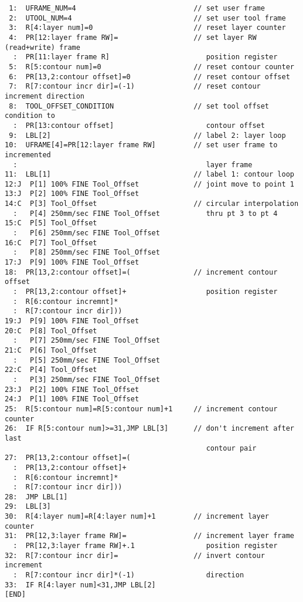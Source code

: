 \begin{verbatim}
 1:  UFRAME_NUM=4                            // set user frame
 2:  UTOOL_NUM=4                             // set user tool frame
 3:  R[4:layer num]=0                        // reset layer counter
 4:  PR[12:layer frame RW]=                  // set layer RW (read+write) frame 
  :  PR[11:layer frame R]                       position register   
 5:  R[5:contour num]=0                      // reset contour counter
 6:  PR[13,2:contour offset]=0               // reset contour offset
 7:  R[7:contour incr dir]=(-1)              // reset contour increment direction
 8:  TOOL_OFFSET_CONDITION                   // set tool offset condition to  
  :  PR[13:contour offset]                      contour offset
 9:  LBL[2]                                  // label 2: layer loop
10:  UFRAME[4]=PR[12:layer frame RW]         // set user frame to incremented 
  :                                             layer frame
11:  LBL[1]                                  // label 1: contour loop
12:J  P[1] 100% FINE Tool_Offset             // joint move to point 1
13:J  P[2] 100% FINE Tool_Offset
14:C  P[3] Tool_Offset                       // circular interpolation 
  :   P[4] 250mm/sec FINE Tool_Offset           thru pt 3 to pt 4
15:C  P[5] Tool_Offset
  :   P[6] 250mm/sec FINE Tool_Offset
16:C  P[7] Tool_Offset
  :   P[8] 250mm/sec FINE Tool_Offset
17:J  P[9] 100% FINE Tool_Offset
18:  PR[13,2:contour offset]=(               // increment contour offset 
  :  PR[13,2:contour offset]+                   position register
  :  R[6:contour incremnt]*
  :  R[7:contour incr dir]))
19:J  P[9] 100% FINE Tool_Offset
20:C  P[8] Tool_Offset
  :   P[7] 250mm/sec FINE Tool_Offset
21:C  P[6] Tool_Offset
  :   P[5] 250mm/sec FINE Tool_Offset
22:C  P[4] Tool_Offset
  :   P[3] 250mm/sec FINE Tool_Offset
23:J  P[2] 100% FINE Tool_Offset
24:J  P[1] 100% FINE Tool_Offset
25:  R[5:contour num]=R[5:contour num]+1     // increment contour counter
26:  IF R[5:contour num]>=31,JMP LBL[3]      // don't increment after last 
                                                contour pair
27:  PR[13,2:contour offset]=(
  :  PR[13,2:contour offset]+
  :  R[6:contour incremnt]*
  :  R[7:contour incr dir]))
28:  JMP LBL[1]
29:  LBL[3]
30:  R[4:layer num]=R[4:layer num]+1         // increment layer counter
31:  PR[12,3:layer frame RW]=                // increment layer frame 
  :  PR[12,3:layer frame RW]+.1                 position register
32:  R[7:contour incr dir]=                  // invert contour increment
  :  R[7:contour incr dir]*(-1)                 direction
33:  IF R[4:layer num]<31,JMP LBL[2]
[END]
\end{verbatim}
